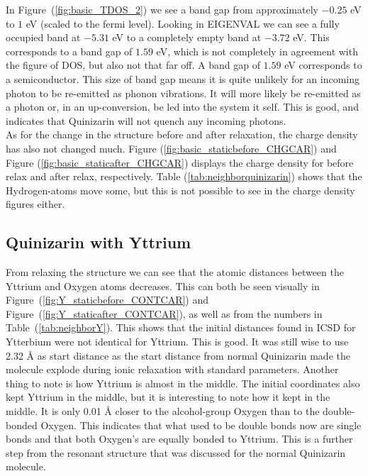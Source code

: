 \documentclass{article}
\begin{document}
    In Figure~(\ref{fig:basic_TDOS_2}) we see a band gap from approximately $-0.25$ eV to $1$ eV (scaled to the fermi level). Looking in EIGENVAL we can see a fully occupied band at $-5.31$ eV to a completely empty band at $-3.72$ eV. This corresponds to a band gap of $1.59$ eV, which is not completely in agreement with the figure of DOS, but also not that far off. A band gap of $1.59$ eV corresponds to a semiconductor. This size of band gap means it is quite unlikely for an incoming photon to be re-emitted as phonon vibrations. It will more likely be re-emitted as a photon or, in an up-conversion, be led into the system it self. This is good, and indicates that Quinizarin will not quench any incoming photons. \\

    As for the change in the structure before and after relaxation, the charge density has also not changed much. Figure (\ref{fig:basic_staticbefore_CHGCAR}) and Figure (\ref{fig:basic_staticafter_CHGCAR}) displays the charge density for before relax and after relax, respectively. Table (\ref{tab:neighborquinizarin}) shows that the Hydrogen-atoms move some, but this is not possible to see in the charge density figures either. \\

  \subsection{Quinizarin with Yttrium}  \label{sec:discussionY}

    From relaxing the structure we can see that the atomic distances between the Yttrium and Oxygen atoms decreases. This can both be seen visually in Figure~(\ref{fig:Y_staticbefore_CONTCAR}) and Figure~(\ref{fig:Y_staticafter_CONTCAR}), as well as from the numbers in Table~(\ref{tab:neighborY}). This shows that the initial distances found in ICSD for Ytterbium were not identical for Yttrium. This is good. It was still wise to use 2.32 Å as start distance as the start distance from normal Quinizarin made the molecule explode during ionic relaxation with standard parameters. Another thing to note is how Yttrium is almost in the middle. The initial coordinates also kept Yttrium in the middle, but it is interesting to note how it kept in the middle. It is only 0.01 Å closer to the alcohol-group Oxygen than to the double-bonded Oxygen. This indicates that what used to be double bonds now are single bonds and that both Oxygen's are equally bonded to Yttrium. This is a further step from the resonant structure that was discussed for the normal Quinizarin molecule. \\
\end{document}
